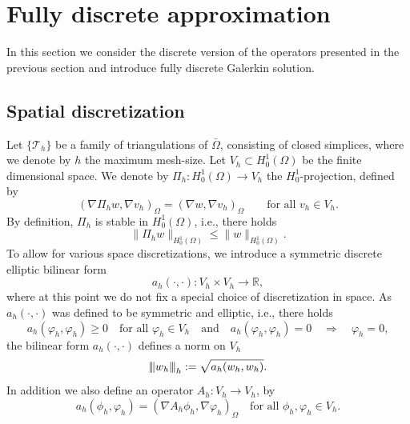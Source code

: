 \documentclass{m2an}
\newcommand{\1}{\mathds{1}}
\newcommand{\Th}{\mathcal{T}_h}
\newcommand{\Om}{\Omega}
\renewcommand{\textforall}{\text{for all }}
\newcommand{\na}{\nabla}
\newcommand{\vertiii}[1]{{\left\vert\kern-0.25ex\left\vert\kern-0.25ex\left\vert #1
    \right\vert\kern-0.25ex\right\vert\kern-0.25ex\right\vert}}
\newcommand{\Oprod}[1]{\left(#1\right)_{\Omega}}
\theoremstyle{definition}
\begin{document}
\section{Fully discrete approximation}\label{sec: discretization}
In this section we consider the  discrete version of the operators presented in the previous section and introduce fully discrete Galerkin solution.  

\subsection{Spatial discretization}\label{sec: space discretization}

Let $\{\Th\}$\label{glos:triangulation} be a 
family of triangulations of $\bar \Omega$, consisting of closed simplices, where we denote by $h$ the maximum mesh-size. Let $V_h\subset H^1_0(\Omega)$ be the finite dimensional space.  
We denote by $\Pi_h\colon H^1_0(\Om) \to V_h$ the $H^1_0$-projection, defined by 
\begin{equation}\label{eq:definition_Pih}
  \Oprod{\nabla \Pi_h w,\nabla v_h} = \Oprod{\nabla w,\nabla v_h} \qquad \textforall v_h \in V_h.
\end{equation}
By definition, $\Pi_h$ is stable in $H^1_0(\Om)$, i.e., there holds 
    \begin{equation}\label{eq:stability_Pih}
        \|\Pi_h w\|_{H^1_0(\Om)} \le \|w\|_{H^1_0(\Om)}.
    \end{equation}
To allow for various space discretizations, we introduce a symmetric discrete elliptic bilinear form 
$$
a_h(\cdot,\cdot):V_h \times V_h \to \mathbb{R},
$$
where at this point we do not fix a special choice of discretization in space.
As $a_h(\cdot,\cdot)$ was defined to be symmetric and elliptic, i.e., there holds
$$
a_h(\varphi_h, \varphi_h)\geq 0\quad \textforall \varphi_h\in V_h\quad\text{and}\quad a_h(\varphi_h, \varphi_h)=0\quad \Rightarrow \quad \varphi_h=0,
$$
the bilinear form $a_h(\cdot,\cdot)$  defines a norm on $V_h$ 
\begin{equation}\label{eq:triple_norm_ah}
\vertiii{w_h}_h := \sqrt{a_h(w_h,w_h)}.
\end{equation}
In addition we also define an operator $A_h\colon V_h\to V_h$, by
\begin{equation}\label{eq:Ah}
a_h(\phi_h,\varphi_h)=(\na A_h \phi_h,\na\varphi_h)_\Om\quad \textforall\phi_h,\varphi_h\in V_h.
\end{equation}
\end{document}
